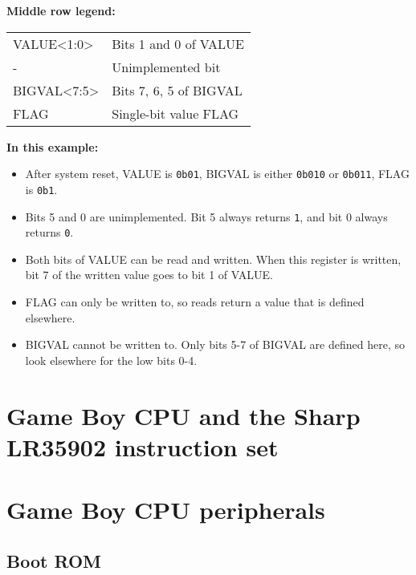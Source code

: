 \documentclass[a4paper, draft, oneside]{memoir}
\newcommand{\bit}[1]{\texttt{#1}}
\newcommand{\bin}[1]{\texttt{0b#1}}
\begin{document}
\begin{register}[H]
  \textbf{Middle row legend:} \\
  {
    \ttfamily
    \begin{tabu} to 0.5\textwidth {|X[l]|X[c]|}
      \everyrow{\hline}
      \hline
      VALUE<1:0> & \rmfamily Bits 1 and 0 of VALUE \\
       - & \rmfamily Unimplemented bit \\
      BIGVAL<7:5> & \rmfamily Bits 7, 6, 5 of BIGVAL \\
      FLAG & \rmfamily Single-bit value FLAG \\
      \hline
    \end{tabu}
  }

  \vspace{3mm}
  \textbf{In this example:}
  \begin{itemize}
    \item{After system reset, VALUE is \bin{01}, BIGVAL is either \bin{010} or \bin{011}, FLAG is \bin{1}.}
    \item{Bits 5 and 0 are unimplemented. Bit 5 always returns \bit{1}, and bit 0 always returns \bit{0}.}
    \item{Both bits of VALUE can be read and written. When this register is written, bit 7 of the written value goes to bit 1 of VALUE.}
    \item{FLAG can only be written to, so reads return a value that is defined elsewhere.}
    \item{BIGVAL cannot be written to. Only bits 5-7 of BIGVAL are defined here, so look elsewhere for the low bits 0-4.}
  \end{itemize}
\end{register}

\part{Game Boy CPU and the Sharp LR35902 instruction set}

\part{Game Boy CPU peripherals}

\chapter{Boot ROM}
\end{document}
